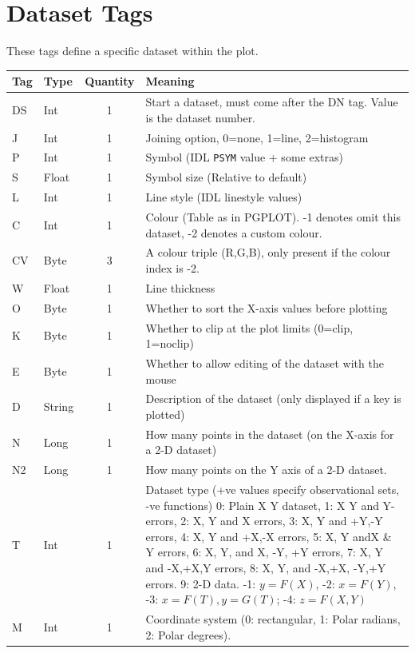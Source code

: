 \documentclass[english]{article}
\begin{document}
\section{Dataset Tags}

These tags define a specific dataset within the plot.

\begin{longtable}{|llcp{8cm}|}
  \hline Tag& Type& Quantity&
  Meaning\\
  \hline
  \endhead
  \hline
  \endfoot
  DS& Int& 1& Start a dataset, must come after the DN tag. Value is the
  dataset
  number.\\
  J& Int& 1&
  Joining option, 0=none, 1=line, 2=histogram\\
  P& Int& 1&
  Symbol (IDL \texttt{PSYM} value + some extras)\\
  S& Float& 1&
  Symbol size (Relative to default)\\
  L& Int& 1&
  Line style (IDL linestyle values)\\
  C& Int& 1&
  Colour (Table as in PGPLOT). -1 denotes omit this dataset, -2
  denotes a custom colour.\\
  CV & Byte & 3 & A colour triple (R,G,B), only present if the colour
  index is -2.\\
  W& Float& 1&
  Line thickness\\
  O& Byte& 1&
  Whether to sort the X-axis values before plotting\\
  K& Byte& 1&
  Whether to clip at the plot limits (0=clip, 1=noclip)\\
  E& Byte& 1&
  Whether to allow editing of the dataset with the mouse\\
  D& String& 1&
  Description of the dataset (only displayed if a key is plotted)\\
  N& Long& 1&
  How many points in the dataset (on the X-axis for a 2-D dataset)\\
  N2& Long& 1&
  How many points on the Y axis of a 2-D dataset.\\
  T& Int& 1& Dataset type (+ve values specify observational sets, -ve
  functions) 0: Plain X Y dataset, 1: X Y and Y-errors, 2: X, Y and X
  errors, 3: X, Y and +Y,-Y errors, 4: X, Y and +X,-X errors, 5: X, Y
  andX \& Y errors, 6: X, Y, and X, -Y, +Y errors, 7: X, Y and -X,+X,Y
  errors, 8: X, Y, and -X,+X, -Y,+Y errors. 9: 2-D data. -1: $y=F(X)$, -2:
  $x=F(Y)$, -3: $x=F(T),
  y=G(T)$; -4: $z=F(X,Y)$\\
  M& Int& 1&
  Coordinate system (0: rectangular, 1: Polar radians, 2: Polar
  degrees).\\

\end{longtable}
\end{document}
